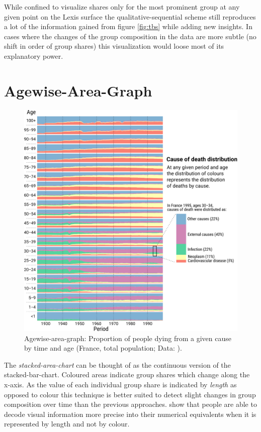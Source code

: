 \documentclass{scrartcl}
\begin{document}
While confined to visualize shares only for the most prominent group at any given point on the Lexis surface the qualitative-sequential scheme still reproduces a lot of the information gained from figure \ref{fig:tbs} while adding new insights. In cases where the changes of the group composition in the data are more subtle (no shift in order of group shares) this visualization would loose most of its explanatory power.

\clearpage

\section{Agewise-Area-Graph} %
\label{sec:aag}

\begin{figure}[!htb]
  \centering
  \includegraphics[width = 0.85\linewidth]{../fig/agewise_area.pdf}
  \caption{Agewise-area-graph: Proportion of people dying from a given cause by time and age (France, total population; Data: \cite{Vallin2014}).}
  \label{fig:aag}
\end{figure}

The \emph{stacked-area-chart} can be thought of as the continuous version of the stacked-bar-chart. Coloured areas indicate group shares which change along the x-axis. As the value of each individual group share is indicated by \emph{length} as opposed to colour this technique is better suited to detect slight changes in group composition over time than the previous approaches. \textcite{Cleveland1984} show that people are able to decode visual information more precise into their numerical equivalents when it is represented by length and not by colour.
\end{document}
